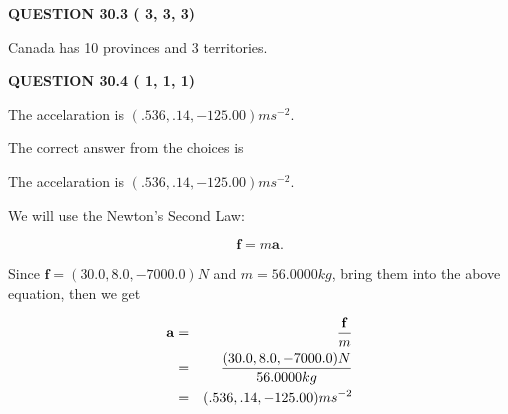 \documentclass[12pt]{article}
\begin{document}
  
 
 
 
 
  
\vspace{0.2in}
  
{\textbf{\Large{QUESTION
30.3 
 (          3,          3,          3)
}}}
  
  
 
 
\noindent{}
 
 
Canada has  %
10 provinces and  %
3 territories.
 
 
 
 
  
\vspace{0.2in}
  
{\textbf{\Large{QUESTION
30.4 
 (          1,          1,          1)
}}}
  
  


 
 
\noindent{}
 
 
The accelaration is $  %
(
.536,
.14,
-125.00)
ms^{-2} $.
 
 
 
 
 
 
\noindent{}

The correct answer from the choices is


The accelaration is $  %
(
.536,
.14,
-125.00)
ms^{-2} $.
 
 
 
 
 
\noindent{}

We will use the Newton's Second Law:
 
\[
\mathbf{f}=m\mathbf{a}.
\]
 
Since $\mathbf{f}= %
(30.0 , 8.0 , -7000.0) N$
and $m= %
56.0000kg$, bring them into the above equation, then we get
 
\begin{eqnarray*}
\mathbf{a}&=&\frac{\mathbf{f}}m  \\
&=&\frac{ %
(30.0 , 8.0 , -7000.0) N}{ %
56.0000kg}  \\
&=& %
(.536 , .14 , -125.00) ms^{-2}
\end{eqnarray*}
 
\end{document}
